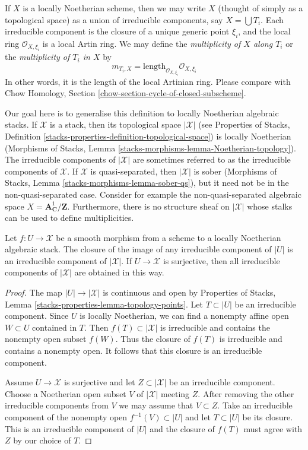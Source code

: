 \noindent
If $X$ is a locally Noetherian scheme, then we may write $X$ (thought
of simply as a topological space) as a union of irreducible components,
say $X = \bigcup T_i$.  Each irreducible component is the closure of a
unique generic point $\xi_i$, and the local ring $\mathcal O_{X,\xi_i}$
is a local Artin ring. We may define the {\it multiplicity of $X$ along $T_i$}
or the {\it multiplicity of $T_i$ in $X$} by
$$
m_{T_i, X} = \text{length}_{\mathcal O_{X, \xi_i}} \mathcal O_{X, \xi_i}
$$
In other words, it is the length of the local Artinian ring. Please
compare with
Chow Homology, Section \ref{chow-section-cycle-of-closed-subscheme}.

\medskip\noindent
Our goal here is to generalise this definition to locally
Noetherian algebraic stacks. If $\mathcal{X}$ is a stack,
then its topological space $|\mathcal{X}|$
(see Properties of Stacks, Definition
\ref{stacks-properties-definition-topological-space})
is locally Noetherian
(Morphisms of Stacks, Lemma \ref{stacks-morphisms-lemma-Noetherian-topology}).
The irreducible components of $|\mathcal{X}|$ are sometimes
referred to as the irreducible components of $\mathcal{X}$.
If $\mathcal{X}$ is quasi-separated, then $|\mathcal{X}|$
is sober (Morphisms of Stacks, Lemma
\ref{stacks-morphisms-lemma-sober-qs}),
but it need not be in the
non-quasi-separated case. Consider for example the non-quasi-separated
algebraic space $X = \mathbf{A}^1_\mathbf{C}/\mathbf{Z}$.
Furthermore, there is no structure sheaf
on $|\mathcal{X}|$ whose stalks can be used to define multiplicities.

\begin{lemma}
\label{lemma-map-of-components}
Let $f : U \to \mathcal{X}$ be a smooth morphism from a scheme
to a locally Noetherian algebraic stack. The closure of the image of any
irreducible component of $|U|$ is an irreducible component of $|\mathcal{X}|$.
If $U \to \mathcal{X}$ is surjective, then all irreducible components of
$|\mathcal{X}|$ are obtained in this way.
\end{lemma}

\begin{proof}
The map $|U| \to |\mathcal{X}|$ is continuous and open by
Properties of Stacks, Lemma \ref{stacks-properties-lemma-topology-points}.
Let $T \subset |U|$ be an irreducible component. Since $U$ is locally
Noetherian, we can find a nonempty affine open $W \subset U$ contained in $T$.
Then $f(T) \subset |\mathcal{X}|$ is irreducible and contains the
nonempty open subset $f(W)$. Thus the closure of $f(T)$ is irreducible and
contains a nonempty open. It follows that this closure is an irreducible
component.

\medskip\noindent
Assume $U \to \mathcal{X}$ is surjective and let $Z \subset |\mathcal{X}|$
be an irreducible component. Choose a Noetherian open subset $V$
of $|\mathcal{X}|$ meeting $Z$. After removing the other irreducible
components from $V$ we may assume that $V \subset Z$.
Take an irreducible component of the nonempty
open $f^{-1}(V) \subset |U|$ and let $T \subset |U|$ be its closure.
This is an irreducible component of $|U|$ and the closure of $f(T)$
must agree with $Z$ by our choice of $T$.
\end{proof}

